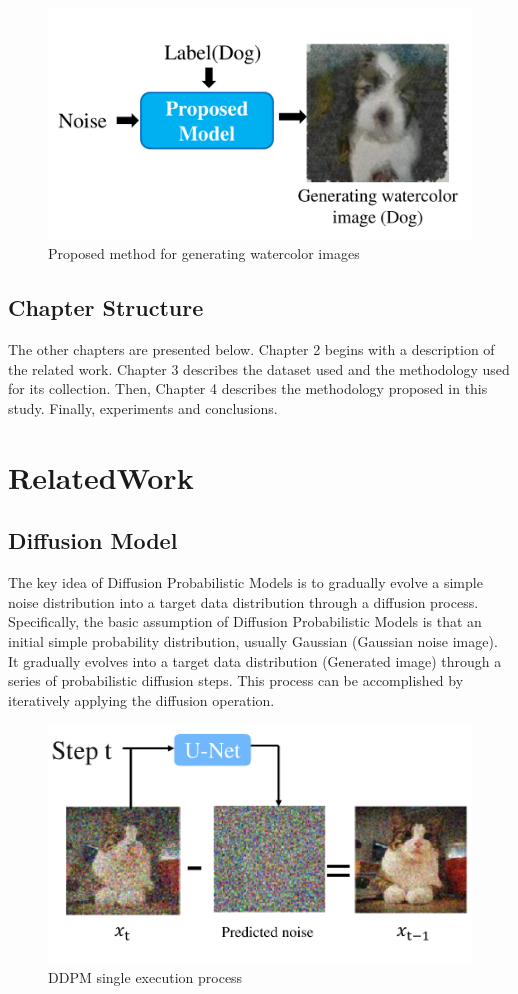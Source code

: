 \documentclass[12pt]{report}
\begin{document}
\begin{figure}[h]
    \centering
    \includegraphics[width=12cm]{image/proposedModel.pdf}
    \caption{Proposed method for generating watercolor images}
    \label{fig:proposedModel}
\end{figure}

\section{Chapter Structure}
The other chapters are presented below. Chapter 2 begins with a description of the related work. Chapter 3 describes the dataset used and the methodology used for its collection. Then, Chapter 4 describes the methodology proposed in this study. Finally,  experiments and conclusions.


\chapter{RelatedWork}
\section{Diffusion Model}
The key idea of Diffusion Probabilistic Models \cite{ho2020denoising} is to gradually evolve a simple noise distribution into a target data distribution through a diffusion process. Specifically, the basic assumption of Diffusion Probabilistic Models is that an initial simple probability distribution, usually Gaussian (Gaussian noise image). It gradually evolves into a target data distribution (Generated image) through a series of probabilistic diffusion steps. This process can be accomplished by iteratively applying the diffusion operation. 
\begin{figure}[h]
    \centering
    \includegraphics[width=12cm]{image/DDPM.pdf}
    \caption{DDPM single execution process}
    \label{fig:DDPM}
\end{figure}
\end{document}

